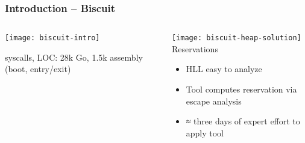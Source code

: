 \begin{frame}[plain]
	\frametitle{Introduction -- Biscuit}
	
	\begin{columns}
		
		\begin{column}{.4\textwidth}
			
			\texttt{[image: biscuit-intro]}
			
			 syscalls, LOC: 28k Go,
			1.5k assembly (boot, entry/exit)
			
		\end{column}
		
		\begin{column}{.6\textwidth}
			\texttt{[image: biscuit-heap-solution]}
			Reservations
			
			\begin{itemize}
				\item HLL easy to analyze
				
				\item Tool computes reservation via escape analysis
				
				\item ≈ three days of expert effort to apply tool
				
			\end{itemize}
		\end{column}
	\end{columns}	
\end{frame}




